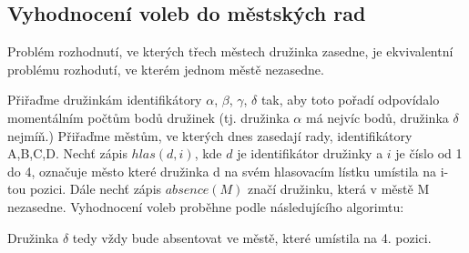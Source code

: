 \documentclass[a4paper, 12pt, twoside]{article}
\begin{document}
\subsection{Vyhodnocení voleb do městských rad}

Problém rozhodnutí, ve kterých třech městech družinka zasedne, je ekvivalentní problému rozhodutí, ve kterém jednom městě nezasedne.

Přiřaďme družinkám identifikátory $\alpha$, $\beta$, $\gamma$, $\delta$ tak, aby toto pořadí odpovídalo momentálním počtům bodů družinek (tj. družinka $\alpha$ má 
nejvíc bodů, družinka $\delta$ nejmíň.)  Přiřaďme městům, ve kterých dnes zasedají rady, identifikátory A,B,C,D.  
Nechť zápis $hlas(d,i)$, kde $d$ je identifikátor družinky a $i$ je číslo od 1 do 4, označuje město které družinka d na svém hlasovacím lístku umístila na i-tou pozici.
Dále nechť zápis $absence(M)$ značí družinku, která v městě M nezasedne.  Vyhodnocení voleb proběhne podle následujícího algorimtu:

\noindent{}

Družinka $\delta$ tedy vždy bude absentovat ve městě, které umístila na 4. pozici.  
\end{document}
